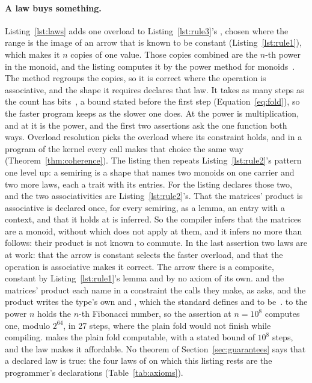 \paragraph{A law buys something.}
Listing~\ref{lst:laws} adds one overload to Listing~\ref{lst:rule3}'s , chosen where the range is the image of an arrow that is known to be constant (Listing~\ref{lst:rule1}), which makes it $n$ copies of one value.
Those copies combined are the $n$-th power in the monoid, and the listing computes it by the power method for monoids~\cite{lang2002algebra,knuth1997art2,stepanov2009elements,ghc2025semigroup}.
The method regroups the copies, so it is correct where the operation is associative, and the shape it requires declares that law.
It takes as many steps as the count has bits~\cite[{\texttt{bit.pow.two}}]{cpp23standard}, a bound stated before the first step (Equation~\eqref{eq:fold}), so the faster program keeps \RuleThree{} as the slower one does.
At  the power is multiplication, and at  it is the power, and the first two assertions ask the one function both ways.
Overload resolution picks the overload where its constraint holds, and in a program of the kernel every call makes that choice the same way (Theorem~\ref{thm:coherence}).
The listing then repeats Listing~\ref{lst:rule2}'s pattern one level up: a semiring is a shape that names two monoids on one carrier and two more laws, each a trait with its entries.
For  the listing declares those two, and the two associativities are Listing~\ref{lst:rule2}'s.
That the matrices' product is associative is declared once, for every semiring, as a lemma, an entry with a context, and that it holds at  is inferred.
So the compiler infers that the matrices are a monoid, without which  does not apply at them, and it infers no more than follows: their product is not known to commute.
In the last assertion two laws are at work: that the arrow is constant selects the faster overload, and that the operation is associative makes it correct.
The arrow there is a composite, constant by Listing~\ref{lst:rule1}'s lemma and by no axiom of its own.
 and the matrices' product each name in a constraint the calls they make, as \RuleTwo{} asks, and the product writes the type's own \cppinline{+} and \cppinline{*}, which the standard defines  and  to be~\cite[{\texttt{arithmetic.operations}}]{cpp23standard}.
 to the power $n$ holds the $n$-th Fibonacci number, so the assertion at $n = 10^8$ computes one, modulo $2^{64}$, in 27 steps, where the plain fold would not finish while compiling.
\RuleThree{} makes the plain fold computable, with a stated bound of $10^8$ steps, and the law makes it affordable.
No theorem of Section~\ref{sec:guarantees} says that a declared law is true: the four laws of  on which this listing rests are the programmer's declarations (Table~\ref{tab:axioms}).
